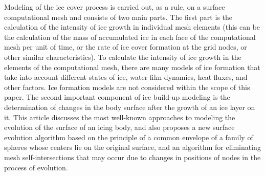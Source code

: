 \documentclass[
11pt,%
tightenlines,%
twoside,%
onecolumn,%
nofloats,%
nobibnotes,%
nofootinbib,%
superscriptaddress,%
noshowpacs,%
centertags]%
{revtex4}
\begin{document}
Modeling of the ice cover process is carried out, as a rule, on a surface computational mesh and consists of two main parts.
The first part is the calculation of the intensity of ice growth in individual mesh elements (this can be the calculation of the mass of accumulated ice in each face of the computational mesh per unit of time, or the rate of ice cover formation at the grid nodes, or other similar characteristics).
To calculate the intensity of ice growth in the elements of the computational mesh, there are many models of ice formation \cite{Bartkus,Zhang,Pena} that take into account different states of ice, water film dynamics, heat fluxes, and other factors.
Ice formation models are not considered within the scope of this paper.
The second important component of ice build-up modeling is the determination of changes in the body surface after the growth of an ice layer on it.
This article discusses the most well-known approaches to modeling the evolution of the surface of an icing body, and also proposes a new surface evolution algorithm based on the principle of a common envelope of a family of spheres whose centers lie on the original surface, and an algorithm for eliminating mesh self-intersections that may occur due to changes in positions of nodes in the process of evolution.
\end{document}
